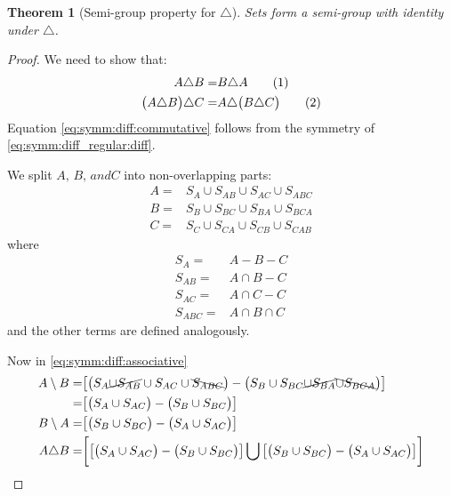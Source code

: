 \documentclass[]{article}
\newcommand\numberthis{\addtocounter{equation}{1}\tag{\theequation}}
\newtheorem{thm}{Theorem}
\begin{document}
\begin{appendices}
	\begin{thm}[Semi-group property for $\triangle$]
		Sets form a semi-group with identity under $\triangle$.
	\end{thm}
	\begin{proof}
		We need to show that:
		\begin{align*}
			A \triangle B =& B \triangle A \numberthis \label{eq:symm:diff:commutative}\\
			\big(A \triangle B\big) \triangle C =& A \triangle \big(B \triangle C\big) \numberthis \label{eq:symm:diff:associative}
		\end{align*}
		Equation \eqref{eq:symm:diff:commutative} follows from the symmetry of \eqref{eq:symm:diff_regular:diff}.
		
		We split $A,\,B,\, and C$ into non-overlapping parts:
		\begin{align*}
			A =& S_A \cup S_{AB} \cup S_{AC} \cup S_{ABC} \\
			B =& S_B \cup S_{BC} \cup S_{BA} \cup S_{BCA}\\
			C =& S_C \cup S_{CA} \cup S_{CB} \cup S_{CAB}
		\end{align*}
		where
		\begin{align*}
			S_A =& A - B - C\\
			S_{AB} =& A \cap B - C\\
			S_{AC} =& A \cap C - C\\
			S_{ABC} =& A \cap B \cap C 
		\end{align*}
		and the other terms are defined analogously.
		
		Now in \eqref{eq:symm:diff:associative}
		\begin{align*}
			A \setminus B =& \big[\big(S_A \cancel{\cup S_{AB}} \cup S_{AC} \cup \bcancel{S_{ABC}}\big) - \big(S_B \cup S_{BC} \cancel{\cup S_{BA}} \bcancel{\cup S_{BCA}}\big)\big]\\
			=& \big[\big(S_A  \cup S_{AC}\big) - \big(S_B \cup S_{BC} \big)\big]\\
			B \setminus A =& \big[\big(S_B  \cup S_{BC}\big) - \big(S_A \cup S_{AC} \big)\big]\\
			A \triangle B =& \bigg[\big[\big(S_A  \cup S_{AC}\big) - \big(S_B \cup S_{BC} \big)\big] \bigcup \big[\big(S_B  \cup S_{BC}\big) - \big(S_A \cup S_{AC} \big)\big]\bigg]
		\end{align*}
		

\end{proof}
\end{appendices}
\end{document}
